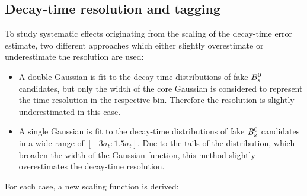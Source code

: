 %


\subsection{Decay-time resolution and tagging}

To study systematic effects originating from the scaling of the decay-time error estimate, 
two different approaches which either slightly overestimate or underestimate the resolution are used:
\begin{itemize}

\item A double Gaussian is fit to the decay-time distributions of fake ${{B}^0_{s}}$ candidates, but only the width of the core Gaussian is considered to represent the time resolution in the respective bin. 
Therefore the resolution is slightly underestimated in this case.

\item A single Gaussian is fit to the decay-time distributions of fake ${{B}^0_{s}}$ candidates in a wide range of $[-3\sigma_{t} : 1.5\sigma_{t}]$. 
Due to the tails of the distribution, which broaden the width of the Gaussian function, this method slightly overestimates the decay-time resolution.   

\end{itemize}
%
For each case, a new scaling function is derived: 

